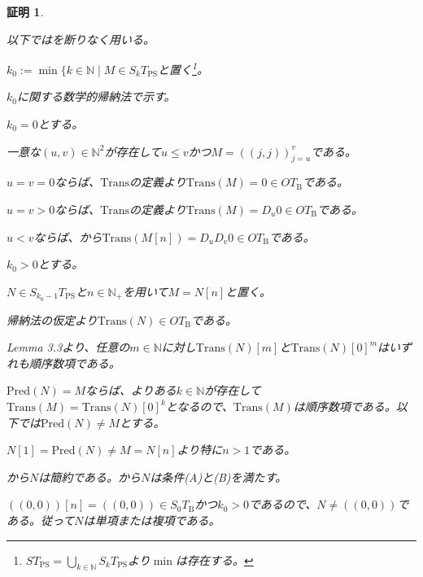\documentclass[dvipdfmx,uplatex]{jsarticle}
\theoremstyle{customnonumberbreakfortheorem}
\theoremstyle{customnonumberbreakforproof}
\newtheorem{hideableproof}{証明}
\begin{document}
\begin{hideableproof}
	\begin{indented}
		\item 以下ではを断りなく用いる。
		\item
		\item \(k_0 := \min \{k \in \mathbb{N} \mid M \in S_kT_{\textrm{PS}}\)と置く\footnote{\(ST_{\textrm{PS}} = \bigcup_{k \in \mathbb{N}} S_kT_{\textrm{PS}}\)より\(\min\)は存在する。}。
		\item \(k_0\)に関する数学的帰納法で示す。
		\item \(k_0 = 0\)とする。
		\begin{indented}
			\item 一意な\((u,v) \in \mathbb{N}^2\)が存在して\(u \leq v\)かつ\(M = ((j,j))_{j=u}^{v}\)である。
			\item \(u = v = 0\)ならば、\(\textrm{Trans}\)の定義より\(\textrm{Trans}(M) = 0 \in OT_{\textrm{B}}\)である。
			\item \(u = v > 0\)ならば、\(\textrm{Trans}\)の定義より\(\textrm{Trans}(M) = D_u 0 \in OT_{\textrm{B}}\)である。
			\item \(u < v\)ならば、から\(\textrm{Trans}(M[n]) = D_u D_v 0 \in OT_{\textrm{B}}\)である。
		\end{indented}
		\item \(k_0 > 0\)とする。
		\begin{indented}
			\item \(N \in S_{k_0-1}T_{\textrm{PS}}\)と\(n \in \mathbb{N}_{+}\)を用いて\(M = N[n]\)と置く。
			\item 帰納法の仮定より\(\textrm{Trans}(N) \in OT_{\textrm{B}}\)である。
			\item \cite{buc1} Lemma 3.3より、任意の\(m \in \mathbb{N}\)に対し\(\textrm{Trans}(N)[m]\)と\(\textrm{Trans}(N)[0]^m\)はいずれも順序数項である。
			\item \(\textrm{Pred}(N) = M\)ならば、よりある\(k \in \mathbb{N}\)が存在して\(\textrm{Trans}(M) = \textrm{Trans}(N)[0]^k\)となるので、\(\textrm{Trans}(M)\)は順序数項である。以下では\(\textrm{Pred}(N) \neq M\)とする。
			\item \(N[1] = \textrm{Pred}(N) \neq M = N[n]\)より特に\(n > 1\)である。
			\item {}から\(N\)は簡約である。から\(N\)は条件(A)と(B)を満たす。
			\item \(((0,0))[n] = ((0,0)) \in S_0T_{\textrm{B}}\)かつ\(k_0 > 0\)であるので、\(N \neq ((0,0))\)である。従って\(N\)は単項または複項である。

\end{indented}
\end{indented}
\end{hideableproof}
\end{document}

